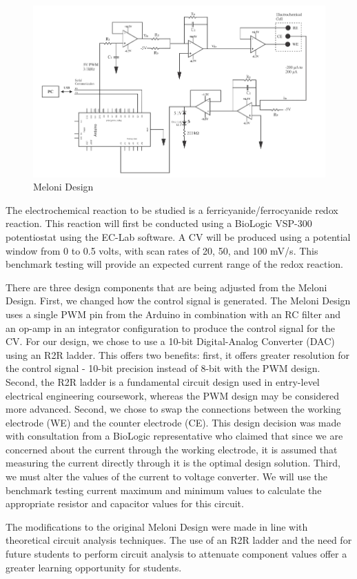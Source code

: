 \documentclass{article}
\begin{document}
\begin{figure}[H]
    \centering
    \includegraphics[width=.7\linewidth]{meloni_design.png}
    \caption{Meloni Design}
\end{figure}

The electrochemical reaction to be studied is a ferricyanide/ferrocyanide redox reaction. This reaction will first be conducted using a BioLogic VSP-300 potentiostat using the EC-Lab software. A CV will be produced using a potential window from 0 to 0.5 volts, with scan rates of 20, 50, and 100 mV/s. This benchmark testing will provide an expected current range of the redox reaction. 

There are three design components that are being adjusted from the Meloni Design. First, we changed how the control signal is generated. The Meloni Design uses a single PWM pin from the Arduino in combination with an RC filter and an op-amp in an integrator configuration to produce the control signal for the CV. For our design, we chose to use a 10-bit Digital-Analog Converter (DAC) using an R2R ladder. This offers two benefits: first, it offers greater resolution for the control signal - 10-bit precision instead of 8-bit with the PWM design. Second, the R2R ladder is a fundamental circuit design used in entry-level electrical engineering coursework, whereas the PWM design may be considered more advanced. Second, we chose to swap the connections between the working electrode (WE) and the counter electrode (CE). This design decision was made with consultation from a BioLogic representative who claimed that since we are concerned about the current through the working electrode, it is assumed that measuring the current directly through it is the optimal design solution. Third, we must alter the values of the current to voltage converter. We will use the benchmark testing current maximum and minimum values to calculate the appropriate resistor and capacitor values for this circuit.

The modifications to the original Meloni Design were made in line with theoretical circuit analysis techniques. The use of an R2R ladder and the need for future students to perform circuit analysis to attenuate component values offer a greater learning opportunity for students.
\end{document}
